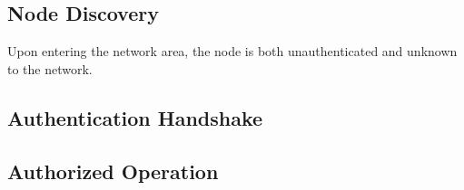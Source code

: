 \subsection{Node Discovery}
Upon entering the network area, the node is both unauthenticated and unknown to
the network.

\subsection{Authentication Handshake}

\subsection{Authorized Operation}